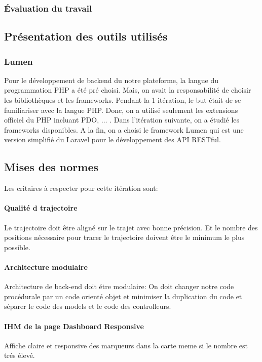 \subsubsection{Évaluation du travail}
\subsection{Présentation des outils utilisés}

\subsubsection{Lumen}

Pour le développement de backend du notre plateforme, la langue du programmation
PHP a été pré choisi. Mais, on avait la responsabilité de choisir les
bibliothèques et les frameworks. Pendant la 1\iere{} itération, le but était de
se familiariser avec la langue PHP. Donc, on a utilisé seulement les extensions
officiel du PHP incluant PDO, $\dotsc$ . Dans l'itération suivante, on a étudié
les frameworks disponibles. A la fin, on a choisi le framework Lumen qui est
une version simplifié du Laravel pour le développement des API \acrshort{RESTful}.


\subsection{Mises des normes}

Les critaires à respecter pour cette itération sont:

\paragraph{Qualité d trajectoire}
Le trajectoire doit être aligné sur le trajet avec bonne précision. Et le nombre
des positions nécessaire pour tracer le trajectoire doivent être le minimum le
plus possible.

\paragraph{Architecture modulaire}
Architecture de back-end doit étre modulaire: On doit changer notre code
procédurale par un code orienté objet et minimiser la duplication du code et
séparer le code des models et le code des controlleurs.

\paragraph{IHM de la page Dashboard Responsive}
Affiche claire et responsive des marqueurs dans la carte meme si le nombre est
trés élevé.

